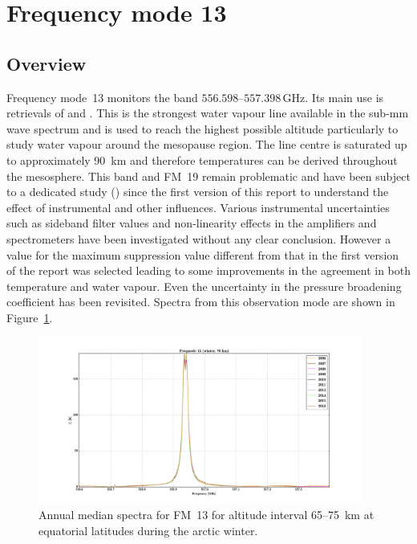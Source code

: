 \section{Frequency mode 13}
\label{sec:fm13}

\subsection{Overview}
\label{sec:fm13:overview}
Frequency mode~13 monitors the band $556.598$--$557.398\,\mathrm{GHz}$. Its
main use is retrievals of  and .
This is the strongest water vapour line available in the sub-mm wave spectrum
and is used to reach the  highest possible altitude particularly to study
water vapour around the mesopause region.  The line centre is saturated up to
approximately 90~km and therefore temperatures can be derived throughout the
mesosphere. This band and FM~19 remain problematic and have been subject to a 
dedicated study (\cite{grieco2020b}) since the first version of this report  to understand the effect of instrumental 
and other influences.  Various instrumental uncertainties such as sideband filter values and non-linearity effects in the amplifiers and spectrometers have been investigated without any clear conclusion.  However a value for the maximum suppression value different from that in the first version of the report was selected leading to some improvements in the agreement in both temperature and water vapour.   Even the uncertainty in the pressure broadening coefficient has been revisited.  
Spectra from this observation mode are shown in Figure~\ref{fig:spectra:13}.

\begin{figure}[ht]
    \centering
    \includegraphics[width=0.95\textwidth]{../DDS/figures/spectra/fm_13_spectra_winter}
    \caption{Annual median spectra for FM~13 for altitude interval 65--75~km at
        equatorial latitudes during the arctic winter.
    }\label{fig:spectra:13}
\end{figure}


